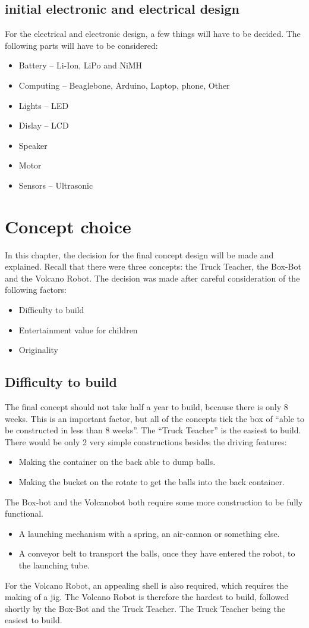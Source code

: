 \documentclass[11pt,twoside,a4paper]{report}
\begin{document}
\section{initial electronic and electrical design}
For the electrical and electronic design, a few things will have to be decided. The following parts will have to be considered: 
\begin{itemize}
\item Battery -- Li-Ion, LiPo and NiMH
\item Computing -- Beaglebone, Arduino, Laptop, phone, Other
\item Lights -- LED
\item Dislay -- LCD
\item Speaker
\item Motor
\item Sensors -- Ultrasonic
\end{itemize}
\chapter{Concept choice}
In this chapter, the decision for the final concept design will be made and explained. Recall that there were three concepts: the Truck Teacher, the Box-Bot and the Volcano Robot. The decision was made after careful consideration of the following factors:
\begin{itemize}
\item Difficulty to build
\item Entertainment value for children
\item Originality
\end{itemize}
\section{Difficulty to build}
The final concept should not take half a year to build, because there is only 8 weeks. This is an important factor, but all of the concepts tick the box of “able to be constructed in less than 8 weeks”. The “Truck Teacher” is the easiest to build. There would be only 2 very simple constructions besides the driving features:
\begin{itemize}
\item Making the container on the back able to dump balls.
\item Making the bucket on the rotate to get the balls into the back container.
\end{itemize}
The Box-bot and the Volcanobot both require some more construction to be fully functional.
\begin{itemize}
\item A launching mechanism with a spring, an air-cannon or something else.
\item A conveyor belt to transport the balls, once they have entered the robot, to the launching tube.
\end{itemize}
For the Volcano Robot, an appealing shell is also required, which requires the making of a jig. The Volcano Robot is therefore the hardest to build, followed shortly by the Box-Bot and the Truck Teacher. The Truck Teacher being the easiest to build.
\end{document}

